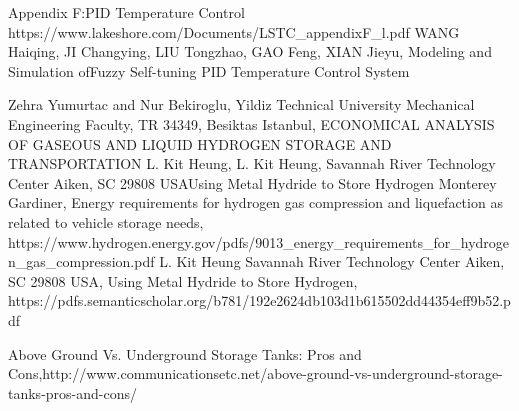 \documentclass[11pt, a4paper]{article}
\begin{document}
\begin{thebibliography}{99}
Appendix F:PID Temperature Control https://www.lakeshore.com/Documents/LSTC\_appendixF\_l.pdf
WANG Haiqing, JI Changying, LIU Tongzhao, GAO Feng, XIAN Jieyu, Modeling and Simulation ofFuzzy Self-tuning PID Temperature Control System


Zehra Yumurtac and Nur Bekiroglu, Yildiz Technical University Mechanical Engineering Faculty, TR 34349, Besiktas Istanbul, ECONOMICAL
ANALYSIS OF GASEOUS AND LIQUID HYDROGEN STORAGE AND TRANSPORTATION
L. Kit Heung, L. Kit Heung, Savannah River Technology Center Aiken, SC 29808 USAUsing Metal Hydride to Store Hydrogen
Monterey Gardiner, Energy requirements for hydrogen gas compression and liquefaction as related to vehicle storage needs, https://www.hydrogen.energy.gov/pdfs/9013\_energy\_requirements\_for\_hydrogen\_gas\_compression.pdf
L. Kit Heung Savannah River Technology Center Aiken, SC 29808 USA, Using Metal Hydride to Store Hydrogen, https://pdfs.semanticscholar.org/b781/192e2624db103d1b615502dd44354eff9b52.pdf




Above Ground Vs. Underground Storage Tanks: Pros and Cons,http://www.communicationsetc.net/above-ground-vs-underground-storage-tanks-pros-and-cons/










\end{thebibliography}
\end{document}
